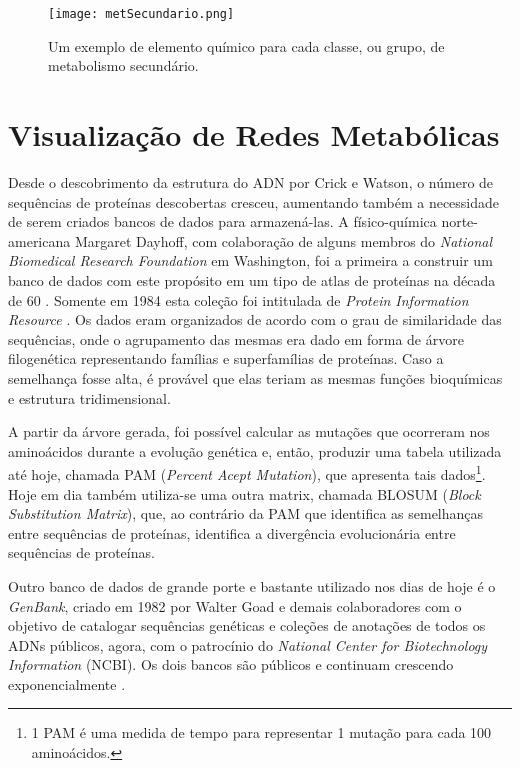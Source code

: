 \begin{figure}[h]
    \centering
    \texttt{[image: metSecundario.png]}
    \caption{Um exemplo de elemento químico para cada classe, ou grupo, de metabolismo secundário.}
    \label{fig:metSecundario}
\end{figure} 


\section{Visualização de Redes Metabólicas} \label{BDredes}



\indent Desde o descobrimento da estrutura do ADN por Crick e Watson, o número de sequências de proteínas descobertas cresceu, aumentando também a necessidade de serem criados bancos de dados para armazená-las. A físico-química norte-americana Margaret Dayhoff, com colaboração de alguns membros do \textit{National Biomedical Research Foundation} em Washington, foi a primeira a construir um banco de dados com este propósito em um tipo de atlas de proteínas na década de 60 \cite{mount01}. Somente em 1984 esta coleção foi intitulada de \textit{Protein Information Resource} \cite{mount01}. Os dados eram organizados de acordo com o grau de similaridade das sequências, onde o agrupamento das mesmas era dado em forma de árvore filogenética representando famílias e superfamílias de proteínas. Caso a semelhança fosse alta, é provável que elas teriam as mesmas funções bioquímicas e estrutura tridimensional.

\indent A partir da árvore gerada, foi possível calcular as mutações que ocorreram nos aminoácidos durante a evolução genética e, então, produzir uma tabela utilizada até hoje, chamada PAM (\textit{Percent Acept Mutation}), que apresenta tais dados\footnote{1 PAM é uma medida de tempo para representar 1 mutação para cada 100 aminoácidos.}. Hoje em dia também utiliza-se uma outra matrix, chamada BLOSUM (\textit{Block Substitution Matrix}), que, ao contrário da PAM que identifica as semelhanças entre sequências de proteínas, identifica a divergência evolucionária entre sequências de proteínas.

\indent Outro banco de dados de grande porte e bastante utilizado nos dias de hoje é o \textit{GenBank}, criado em 1982 por Walter Goad e demais colaboradores com o objetivo de catalogar sequências genéticas e coleções de anotações de todos os ADNs públicos, agora, com o patrocínio do \textit{National Center for Biotechnology Information} (NCBI). Os dois bancos são públicos e continuam crescendo exponencialmente \cite{mount01}. 

